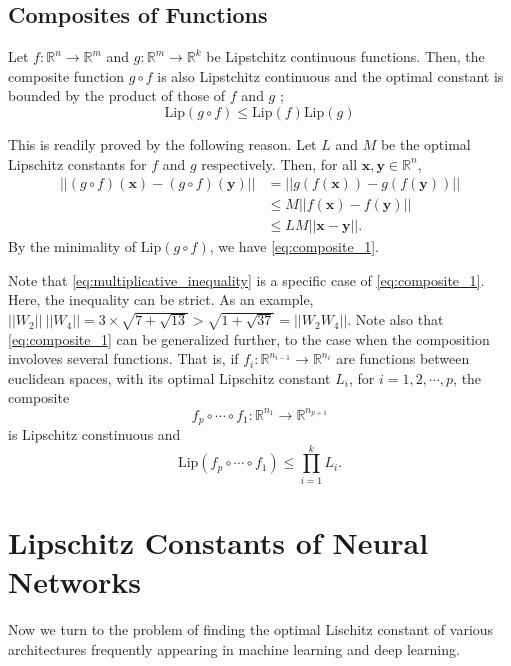 \documentclass[12pt]{report}
\numberwithin{figure}{chapter}
\theoremstyle{plain}
\theoremstyle{definition}
\theoremstyle{corollary}
\theoremstyle{definition}
\theoremstyle{plain}
\theoremstyle{definition}
\theoremstyle{plain}
\newcommand\bx{\ensuremath{\boldsymbol x}}
\newcommand\by{\ensuremath{\boldsymbol y}}
\newcommand\lip{\ensuremath{\text{Lip}}}
\begin{document}
\section{Composites of Functions}
Let \(f:\mathbb R^n\to\mathbb R^m\) and \(g:\mathbb R^m\to\mathbb R^k\) be Lipstchitz continuous functions.
Then, the composite function \(g\circ f\) is also Lipstchitz continuous and the optimal constant is bounded by the product of those of \(f\) and \(g\) ; 
\begin{equation}\label{eq:composite_1}
\lip(g\circ f)\le\lip(f)\lip(g)
\end{equation}

This is readily proved by the following reason.
Let \(L\) and \(M\) be the optimal Lipschitz constants for \(f\) and \(g\) respectively.
Then, for all \(\bx,\by\in\mathbb R^n\),
\begin{align*}
||(g\circ f)(\bx)-(g\circ f)(\by)||
&=||g(f(\bx))-g(f(\by))||\\
&\le M||f(\bx)-f(\by)||\\
&\le LM||\bx-\by||.
\end{align*}
By the minimality of \(\lip(g\circ f)\), we have \eqref{eq:composite_1}.

Note that \eqref{eq:multiplicative_inequality} is a specific case of \eqref{eq:composite_1}.
Here, the inequality can be strict.
As an example, \(||W_2||\:||W_4||=3\times\sqrt{7+\sqrt{13}}>\sqrt{1+\sqrt{37}}=||W_2W_4||\).
Note also that \eqref{eq:composite_1} can be generalized further, to the case when the composition involoves several functions.
That is, if \(f_i:\mathbb R^{n_{i-1}}\to\mathbb R^{n_i}\) are  functions between euclidean spaces, with its optimal Lipschitz constant \(L_i\), for \(i=1,2,\cdots,p\), the composite
\[f_p\circ\cdots\circ f_1:\mathbb R^{n_1}\to\mathbb R^{n_{p+1}}\]
is Lipschitz constinuous and
\begin{equation}\label{eq:composite_2}
\lip(f_p\circ\cdots\circ f_1)\le\prod_{i=1}^kL_i.
\end{equation}

\chapter{Lipschitz Constants of Neural Networks}\label{ch3}

Now we turn to the problem of finding the optimal Lischitz constant of various architectures frequently appearing in machine learning and deep learning.
\end{document}
